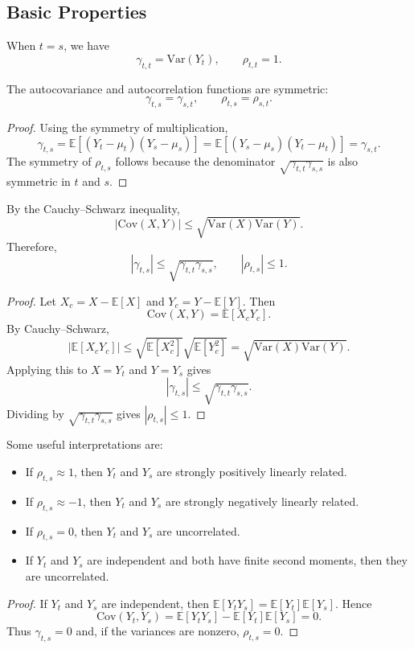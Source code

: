 \documentclass[12pt,oneside]{book}
\numberwithin{equation}{section}
\theoremstyle{definition}
\theoremstyle{plain}
\theoremstyle{remark}
\newcommand{\E}{\mathbb{E}}
\newcommand{\Var}{\mathrm{Var}}
\newcommand{\Cov}{\mathrm{Cov}}
\begin{document}
\subsection*{Basic Properties}

When $t=s$, we have
\[
\gamma_{t,t}=\Var(Y_t),
\qquad
\rho_{t,t}=1.
\]

The autocovariance and autocorrelation functions are symmetric:
\[
\gamma_{t,s}=\gamma_{s,t},
\qquad
\rho_{t,s}=\rho_{s,t}.
\]

\begin{proof}
Using the symmetry of multiplication,
\[
\gamma_{t,s}
=
\E[(Y_t-\mu_t)(Y_s-\mu_s)]
=
\E[(Y_s-\mu_s)(Y_t-\mu_t)]
=
\gamma_{s,t}.
\]
The symmetry of $\rho_{t,s}$ follows because the denominator $\sqrt{\gamma_{t,t}\gamma_{s,s}}$ is also symmetric in $t$ and $s$.
\end{proof}

By the Cauchy--Schwarz inequality,
\[
|\Cov(X,Y)| \leq \sqrt{\Var(X)\Var(Y)}.
\]
Therefore,
\[
|\gamma_{t,s}|
\leq
\sqrt{\gamma_{t,t}\gamma_{s,s}},
\qquad
|\rho_{t,s}|\leq 1.
\]

\begin{proof}
Let $X_c=X-\E[X]$ and $Y_c=Y-\E[Y]$. Then
\[
\Cov(X,Y)=\E[X_cY_c].
\]
By Cauchy--Schwarz,
\[
|\E[X_cY_c]|
\leq
\sqrt{\E[X_c^2]}\sqrt{\E[Y_c^2]}
=
\sqrt{\Var(X)\Var(Y)}.
\]
Applying this to $X=Y_t$ and $Y=Y_s$ gives
\[
|\gamma_{t,s}|
\leq
\sqrt{\gamma_{t,t}\gamma_{s,s}}.
\]
Dividing by $\sqrt{\gamma_{t,t}\gamma_{s,s}}$ gives $|\rho_{t,s}|\leq 1$.
\end{proof}

Some useful interpretations are:

\begin{itemize}
\item If $\rho_{t,s}\approx 1$, then $Y_t$ and $Y_s$ are strongly positively linearly related.
\item If $\rho_{t,s}\approx -1$, then $Y_t$ and $Y_s$ are strongly negatively linearly related.
\item If $\rho_{t,s}=0$, then $Y_t$ and $Y_s$ are uncorrelated.
\item If $Y_t$ and $Y_s$ are independent and both have finite second moments, then they are uncorrelated.
\end{itemize}

\begin{proof}
If $Y_t$ and $Y_s$ are independent, then $\E[Y_tY_s]=\E[Y_t]\E[Y_s]$. Hence
\[
\Cov(Y_t,Y_s)
=
\E[Y_tY_s]-\E[Y_t]\E[Y_s]
=
0.
\]
Thus $\gamma_{t,s}=0$ and, if the variances are nonzero, $\rho_{t,s}=0$.
\end{proof}
\end{document}
